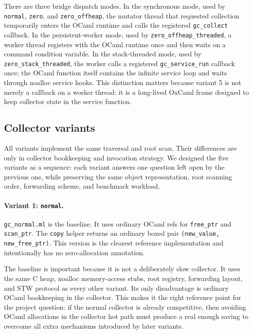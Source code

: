 \documentclass[11pt,a4paper]{article}
\begin{document}
There are three bridge dispatch modes.  In the synchronous mode, used by
\texttt{normal}, \texttt{zero}, and \texttt{zero\_offheap}, the mutator thread
that requested collection temporarily enters the OCaml runtime and calls the
registered \texttt{gc\_collect} callback.  In the persistent-worker mode, used
by \texttt{zero\_offheap\_threaded}, a worker thread registers with the OCaml
runtime once and then waits on a command condition variable.  In the
stack-threaded mode, used by \texttt{zero\_stack\_threaded}, the worker calls a
registered \texttt{gc\_service\_run} callback once; the OCaml function itself
contains the infinite service loop and waits through noalloc service hooks.
This distinction matters because variant 5 is not merely a callback on a worker
thread: it is a long-lived OxCaml frame designed to keep collector state in the
service function.

\subsection{Collector variants}

All variants implement the same traversal and root scan.  Their differences are
only in collector bookkeeping and invocation strategy.  We designed the five
variants as a sequence: each variant answers one question left open by the
previous one, while preserving the same object representation, root scanning
order, forwarding scheme, and benchmark workload.

\paragraph{Variant 1: \texttt{normal}.}
\texttt{gc\_normal.ml} is the baseline.  It uses ordinary OCaml refs for
\texttt{free\_ptr} and \texttt{scan\_ptr}.  The \texttt{copy} helper returns an
ordinary boxed pair \texttt{(new\_value, new\_free\_ptr)}.  This version is the
clearest reference implementation and intentionally has no zero-allocation
annotation.

The baseline is important because it is not a deliberately slow collector.  It
uses the same C heap, noalloc memory-access stubs, root registry, forwarding
layout, and STW protocol as every other variant.  Its only disadvantage is
ordinary OCaml bookkeeping in the collector.  This makes it the right reference
point for the project question: if the normal collector is already competitive,
then avoiding OCaml allocations in the collector hot path must produce a real
enough saving to overcome all extra mechanisms introduced by later variants.
\end{document}
